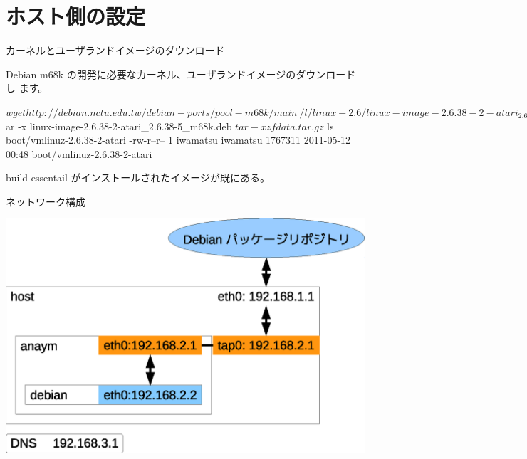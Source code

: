 \section{ホスト側の設定}

\begin{frame}[containsverbatim]{カーネルとユーザランドイメージのダウンロード}

Debian m68k の開発に必要なカーネル、ユーザランドイメージのダウンロードし
ます。
\begin{commandline}
$ wget http://debian.nctu.edu.tw/debian-ports/pool-m68k/main \ 
    /l/linux-2.6/linux-image-2.6.38-2-atari_2.6.38-5_m68k.deb
$ ar -x linux-image-2.6.38-2-atari_2.6.38-5_m68k.deb
$ tar -xzf data.tar.gz
$ ls boot/vmlinuz-2.6.38-2-atari
-rw-r--r-- 1 iwamatsu iwamatsu 1767311 2011-05-12 00:48 boot/vmlinuz-2.6.38-2-atari
\end{commandline}
\end{frame}

\begin{frame}[containsverbatim]
build-essentail がインストールされたイメージが既にある。


\end{frame}

\begin{frame}[containsverbatim]{ネットワーク構成}

\begin{center}
\includegraphics[width=0.8\hsize]{image201105/m68k-aranym-network.eps}
\end{center}

\end{frame}

